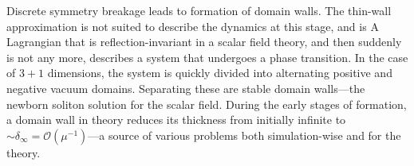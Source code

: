 



\newcommand{\lcoord}{\ALIASlcoord} %
\newcommand{\lcoordx}{\ALIASlcoordx} %
\newcommand{\lcoordk}{\ALIASlcoordk} %
\newcommand*\Ft{\ALIASFt}
\newcommand\dummy{\ALIASdummy}













Discrete symmetry breakage leads to formation of domain walls. The thin-wall approximation is not suited to describe the dynamics at this stage, and is  A Lagrangian that is reflection-invariant in a scalar field theory, and then suddenly is not any more, describes a system that undergoes a phase transition. In the case of $3+1$ dimensions, the system is quickly divided into alternating positive and negative vacuum domains. Separating these are stable domain walls---the newborn soliton solution for the scalar field. During the early stages of formation, a domain wall in theory reduces its thickness from initially infinite to $\sim \delta_\infty = \mathscr{O}(\mu^{-1})$---a source of various problems both simulation-wise and for the theory. 





